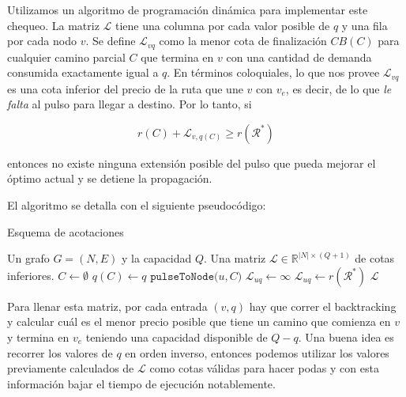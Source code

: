 Utilizamos un algoritmo de programación dinámica para implementar este chequeo. La matriz $\mathscr{L}$ tiene una columna por cada valor posible de $q$ y una fila por cada nodo $v$. Se define $\mathscr{L}_{vq}$ como la menor cota de finalización $CB(C)$ para cualquier camino parcial $C$ que termina en $v$ con una cantidad de demanda consumida exactamente igual a $q$. En términos coloquiales, lo que nos provee $\mathscr{L}_{vq}$ es una cota inferior del precio de la ruta que une $v$ con $v_e$, es decir, de lo que \emph{le falta} al pulso para llegar a destino. Por lo tanto, si 

\begin{equation}
\label{eq:completion-bound-check}
    r(C) + \mathscr{L}_{v, q(C)} \geq r(\mathscr{R}^{*})
\end{equation}

entonces no existe ninguna extensión posible del pulso que pueda mejorar el óptimo actual y se detiene la propagación.

El algoritmo se detalla con el siguiente pseudocódigo:

\begin{algorithm}[H]
  \caption{Esquema de acotaciones}
  \label{al:pulse-bound}
  \begin{algorithmic}[1]
  	\Require Un grafo $G=(N, E)$ y la capacidad $Q$.
  	\Ensure Una matriz $\mathscr{L} \in \mathbb{R}^{|N| \times (Q+1)}$ de cotas inferiores.
                \State $C \gets \emptyset$ 
                \State $q(C) \gets q$
                \State $\texttt{pulseToNode(}u, C \texttt{)}$
                    \State $\mathscr{L}_{uq} \gets \infty$
                \Else
                    \State $\mathscr{L}_{uq} \gets r(\mathscr{R}^{*})$
                \EndIf
            \EndFor
        \EndFor
        \Return $\mathscr{L}$
  \end{algorithmic}
\end{algorithm}

Para llenar esta matriz, por cada entrada $(v, q)$ hay que correr el backtracking y calcular cuál es el menor precio posible que tiene un camino que comienza en $v$ y termina en $v_e$ teniendo una capacidad disponible de $Q - q$. Una buena idea es recorrer los valores de $q$ en orden inverso, entonces podemos utilizar los valores previamente calculados de $\mathscr{L}$ como cotas válidas para hacer podas y con esta información bajar el tiempo de ejecución notablemente. 

